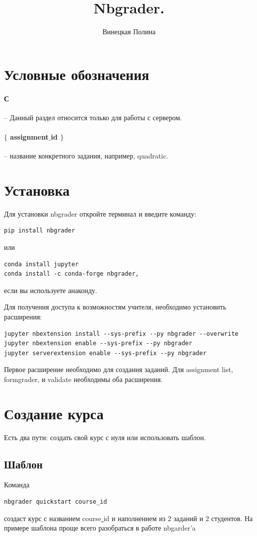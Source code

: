 \documentclass[a4paper,12pt]{article}
\title{Nbgrader.}
\author{Винецкая Полина}
\begin{document}
\maketitle
\tableofcontents
\section{Условные обозначения}

\paragraph{С} -- Данный раздел относится только для работы с сервером.
\paragraph{$\{$ assignment$\_$id $\}$} -- название конкретного задания, например, quadratic.

\section{Установка} 

Для установки nbgrader откройте терминал и введите команду:
\begin{verbatim}
pip install nbgrader
\end{verbatim}
или
\begin{verbatim}
conda install jupyter
conda install -c conda-forge nbgrader,
\end{verbatim}
если вы используете анаконду.


Для получения доступа к возможностям учителя, 
необходимо установить расширения:
\begin{verbatim}
jupyter nbextension install --sys-prefix --py nbgrader --overwrite
jupyter nbextension enable --sys-prefix --py nbgrader
jupyter serverextension enable --sys-prefix --py nbgrader
\end{verbatim}
Первое расширение необходимо для создания заданий.
Для assignment list, formgrader, и validate необходимы оба расширения.
\section{Создание курса} Есть два пути: создать свой курс с нуля или использовать шаблон.
\subsection{Шаблон}

Команда
\begin{verbatim}
nbgrader quickstart course_id 
\end{verbatim}
создаст курс с названием course\underline{ }id и наполнением из 2 заданий и 2 студентов. На примере шаблона проще всего разобраться в работе nbgarder'a
\end{document}
